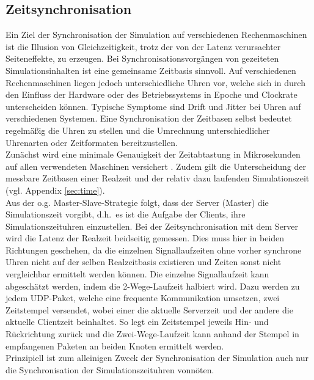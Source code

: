 \subsection{Zeitsynchronisation}

Ein Ziel der Synchronisation der Simulation auf verschiedenen Rechenmaschinen ist die Illusion von Gleichzeitigkeit, trotz der von der Latenz verursachter Seiteneffekte, zu erzeugen.
Bei Synchronisationsvorgängen von gezeiteten Simulationsinhalten ist eine gemeinsame Zeitbasis sinnvoll.
Auf verschiedenen Rechenmaschinen liegen jedoch unterschiedliche Uhren vor, welche sich in durch den Einfluss der Hardware oder des Betriebssystems in Epoche und Clockrate unterscheiden können. Typische Symptome sind Drift und Jitter bei Uhren auf verschiedenen Systemen.
Eine Synchronisation der Zeitbasen selbst bedeutet regelmäßig die Uhren zu stellen und die Umrechnung unterschiedlicher Uhrenarten oder Zeitformaten bereitzustellen.\\
Zunächst wird eine minimale Genauigkeit der Zeitabtastung in Mikrosekunden auf allen verwendeten Maschinen versichert . Zudem gilt die Unterscheidung der messbare Zeitbasen einer Realzeit und der relativ dazu laufenden Simulationszeit (vgl. Appendix \ref{sec:time}).\\
Aus der o.g. Master-Slave-Strategie folgt, dass der Server (Master) die Simulationszeit vorgibt, d.h.~es ist die Aufgabe der Clients, ihre Simulationszeituhren einzustellen. 
Bei der Zeitsynchronisation mit dem Server wird die Latenz der Realzeit beidseitig gemessen.
Dies muss hier in beiden Richtungen geschehen, da die einzelnen Signallaufzeiten ohne vorher synchrone Uhren nicht auf der selben Realzeitbasis existieren und Zeiten sonst nicht vergleichbar ermittelt werden können. 
Die einzelne Signallaufzeit kann abgeschätzt werden, indem die 2-Wege-Laufzeit halbiert wird. Dazu werden zu jedem UDP-Paket, welche eine frequente Kommunikation umsetzen, zwei Zeitstempel versendet, wobei einer die aktuelle Serverzeit und der andere die aktuelle Clientzeit beinhaltet.
So legt ein Zeitstempel jeweils Hin- und Rückrichtung zurück und die Zwei-Wege-Laufzeit kann anhand der Stempel in empfangenen Paketen an beiden Knoten ermittelt werden.\\
Prinzipiell ist zum alleinigen Zweck der Synchronisation der Simulation auch nur die Synchronisation der Simulationszeituhren vonnöten.


